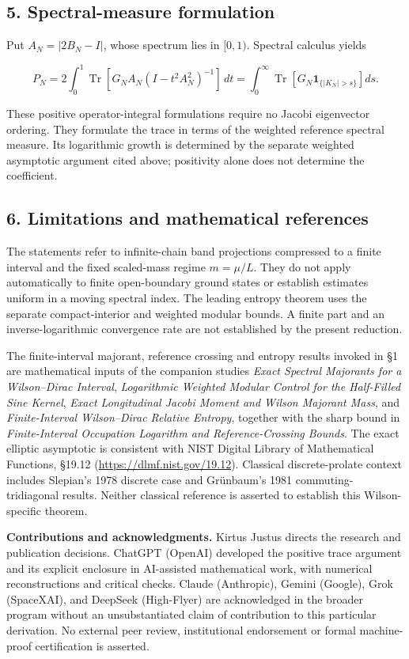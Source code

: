 \documentclass[
  10pt,
  a4paper,
]{article}
\begin{document}
\subsection{5. Spectral-measure formulation}\label{spectral-measure-formulation}

Put \(A_N=|2B_N-I|\), whose spectrum lies in \([0,1)\). Spectral calculus yields

\[
P_N=2\int_0^1\operatorname{Tr}[G_NA_N(I-t^2A_N^2)^{-1}]\,dt
=\int_0^\infty\operatorname{Tr}[G_N\mathbf1_{\{|K_N|>s\}}]ds.
\tag{12}
\]

These positive operator-integral formulations require no Jacobi eigenvector ordering. They formulate the trace in terms of the weighted reference spectral measure. Its logarithmic growth is determined by the separate weighted asymptotic argument cited above; positivity alone does not determine the coefficient.

\subsection{6. Limitations and mathematical references}\label{limitations-and-mathematical-references}

The statements refer to infinite-chain band projections compressed to a finite interval and the fixed scaled-mass regime \(m=\mu/L\). They do not apply automatically to finite open-boundary ground states or establish estimates uniform in a moving spectral index. The leading entropy theorem uses the separate compact-interior and weighted modular bounds. A finite part and an inverse-logarithmic convergence rate are not established by the present reduction.

The finite-interval majorant, reference crossing and entropy results invoked in §1 are mathematical inputs of the companion studies \emph{Exact Spectral Majorants for a Wilson--Dirac Interval}, \emph{Logarithmic Weighted Modular Control for the Half-Filled Sine Kernel}, \emph{Exact Longitudinal Jacobi Moment and Wilson Majorant Mass}, and \emph{Finite-Interval Wilson--Dirac Relative Entropy}, together with the sharp bound in \emph{Finite-Interval Occupation Logarithm and Reference-Crossing Bounds}. The exact elliptic asymptotic is consistent with NIST Digital Library of Mathematical Functions, §19.12 (\url{https://dlmf.nist.gov/19.12}). Classical discrete-prolate context includes Slepian's 1978 discrete case and Grünbaum's 1981 commuting-tridiagonal results. Neither classical reference is asserted to establish this Wilson-specific theorem.

\textbf{Contributions and acknowledgments.} Kirtus Justus directs the research and publication decisions. ChatGPT (OpenAI) developed the positive trace argument and its explicit enclosure in AI-assisted mathematical work, with numerical reconstructions and critical checks. Claude (Anthropic), Gemini (Google), Grok (SpaceXAI), and DeepSeek (High-Flyer) are acknowledged in the broader program without an unsubstantiated claim of contribution to this particular derivation. No external peer review, institutional endorsement or formal machine-proof certification is asserted.
\end{document}
